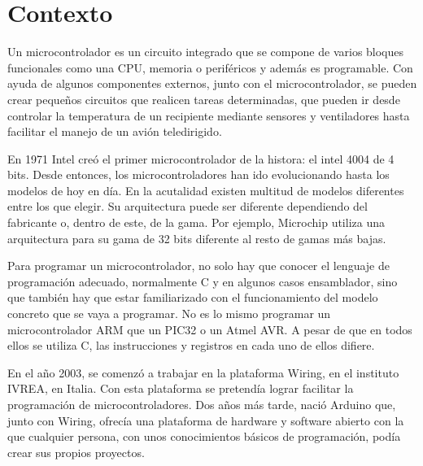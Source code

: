 

\section{Contexto} %
%
\label{sec:Contexto}
Un microcontrolador es un circuito integrado que se compone de varios bloques funcionales como una CPU, memoria o periféricos y además es programable. Con ayuda de algunos componentes externos, junto con el microcontrolador, se pueden crear pequeños circuitos que realicen tareas determinadas, que pueden ir desde controlar la temperatura de un recipiente mediante sensores y ventiladores hasta facilitar el manejo de un avión teledirigido.

En 1971 Intel creó el primer microcontrolador de la histora: el intel 4004 de 4 bits. Desde entonces, los microcontroladores han ido evolucionando hasta los modelos de hoy en día. En la acutalidad existen multitud de modelos diferentes entre los que elegir. Su arquitectura puede ser diferente dependiendo del fabricante o, dentro de este, de la gama. Por ejemplo, Microchip utiliza una arquitectura para su gama de 32 bits diferente al resto de gamas más bajas.

Para programar un microcontrolador, no solo hay que conocer el lenguaje de programación adecuado, normalmente C y en algunos casos ensamblador, sino que también hay que estar familiarizado con el funcionamiento del modelo concreto que se vaya a programar. No es lo mismo programar un microcontrolador ARM que un PIC32 o un Atmel AVR. A pesar de que en todos ellos se utiliza C, las instrucciones y registros en cada uno de ellos difiere.

En el año 2003, se comenzó a trabajar en la plataforma Wiring, en el instituto IVREA, en Italia. Con esta plataforma se pretendía lograr facilitar la programación de microcontroladores. Dos años más tarde, nació Arduino que, junto con Wiring, ofrecía una plataforma de hardware y software abierto con la que cualquier persona, con unos conocimientos básicos de programación, podía crear sus propios proyectos.

